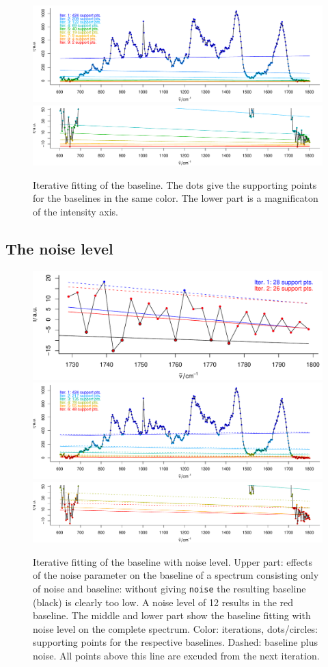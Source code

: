 \documentclass[a4paper, 10pt, smallheadings, DIV15]{scrartcl}
\newcommand{\code}[1]{\nohyphens{\texttt{#1}}\xspace}
\begin{document}
\begin{figure}[bh]
\begin{center}
  \includegraphics[width=.75\textwidth]{baselinebelow-fig1}
  \includegraphics[width=.75\textwidth]{baselinebelow-fig2}
  \caption{Iterative fitting of the baseline. The dots give the supporting points for the baselines in the same color. 
  The lower part is a magnificaton of the intensity axis.}
  \label{fig:iter}
\end{center}
\end{figure}

\subsection*{The noise level}
\begin{figure}[t]
\begin{center}
  \includegraphics[width=.5\textwidth]{baselinebelow-fig3}
  \includegraphics[width=.75\textwidth]{baselinebelow-fig4}
  \includegraphics[width=.75\textwidth]{baselinebelow-fig5}
  \caption{Iterative fitting of the baseline with noise level. Upper part: effects of the noise parameter on the baseline 
  of a spectrum consisting only of noise and baseline:  without giving \code{noise} the resulting baseline 
  (black) is clearly too low. A noise level of 12 results in the red baseline. 
  The middle and lower part show the baseline fitting with noise level on the 
  complete spectrum.
  Color: iterations, dots/circles: supporting points for the respective baselines. Dashed: baseline plus noise. All points above this line are excuded from the next iteration.  
}
  \label{fig:noise}
\end{center}
\end{figure}
\end{document}
